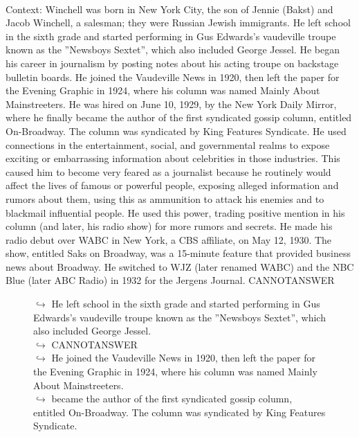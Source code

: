 \documentclass[11pt,a4paper, onecolumn]{article}
\begin{document}
\\ Context: Winchell was born in New York City, the son of Jennie (Bakst) and Jacob Winchell, a salesman; they were Russian Jewish immigrants. He left school in the sixth grade and started performing in Gus Edwards's vaudeville troupe known as the ''Newsboys Sextet'', which also included George Jessel. He began his career in journalism by posting notes about his acting troupe on backstage bulletin boards. He joined the Vaudeville News in 1920, then left the paper for the Evening Graphic in 1924, where his column was named Mainly About Mainstreeters. He was hired on June 10, 1929, by the New York Daily Mirror, where he finally became the author of the first syndicated gossip column, entitled On-Broadway. The column was syndicated by King Features Syndicate. He used connections in the entertainment, social, and governmental realms to expose exciting or embarrassing information about celebrities in those industries. This caused him to become very feared as a journalist because he routinely would affect the lives of famous or powerful people, exposing alleged information and rumors about them, using this as ammunition to attack his enemies and to blackmail influential people. He used this power, trading positive mention in his column (and later, his radio show) for more rumors and secrets. He made his radio debut over WABC in New York, a CBS affiliate, on May 12, 1930. The show, entitled Saks on Broadway, was a 15-minute feature that provided business news about Broadway. He switched to WJZ (later renamed WABC) and the NBC Blue (later ABC Radio) in 1932 for the Jergens Journal. CANNOTANSWER

\begin{figure}[t] \small \begin{tcolorbox}[boxsep=0pt,left=5pt,right=0pt,top=2pt,colback = yellow!5] \begin{dialogue}
 \small 
\colorbox{pink!25}{$\hookrightarrow$}
{ He left school in the sixth grade and started performing in Gus Edwards's vaudeville troupe known as the ''Newsboys Sextet'', which also included George Jessel. }
\\
\colorbox{pink!25}{$\hookrightarrow$}
{ CANNOTANSWER }
\\
\colorbox{pink!25}{$\hookrightarrow$}
{ He joined the Vaudeville News in 1920, then left the paper for the Evening Graphic in 1924, where his column was named Mainly About Mainstreeters. }
\\
\colorbox{pink!25}{$\hookrightarrow$}
{ became the author of the first syndicated gossip column, entitled On-Broadway. The column was syndicated by King Features Syndicate. }
\\
 \end{dialogue}\end{tcolorbox}\end{figure}
\end{document}

